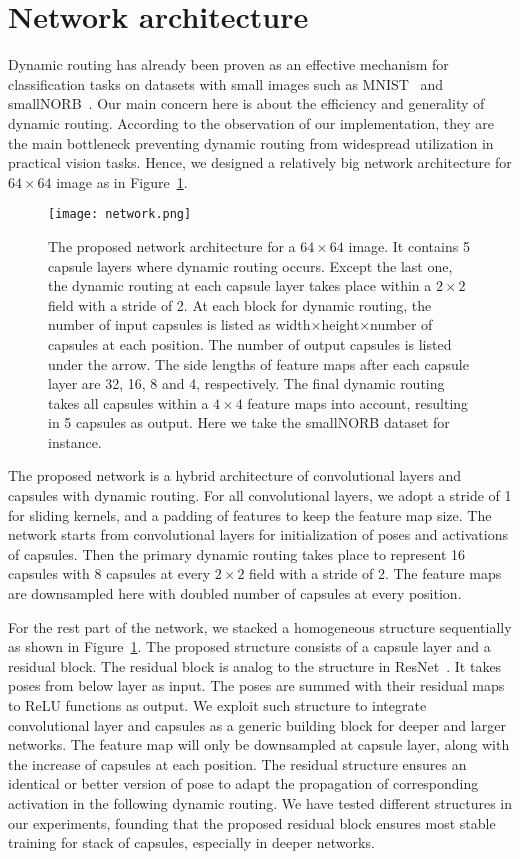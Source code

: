 \documentclass[runningheads]{llncs}
\begin{document}
\section{Network architecture}
Dynamic routing has already been proven as an effective mechanism for classification tasks on datasets with small images such as MNIST~\cite{lecun1998gradient} and smallNORB~\cite{lecun2004learning}. Our main concern here is about the efficiency and generality of dynamic routing. According to the observation of our implementation, they are the main bottleneck preventing dynamic routing from widespread utilization in practical vision tasks. Hence, we designed a relatively big network architecture for $64\times{64}$ image as in Figure~\ref{fig:network}. \begin{figure}
\centering
\texttt{[image: network.png]}
\caption{The proposed network architecture for a $64\times{64}$ image. It contains 5 capsule layers where dynamic routing occurs. Except the last one, the dynamic routing at each capsule layer takes place within a $2\times{2}$ field with a stride of 2. At each block for dynamic routing, the number of input capsules is listed as width$\times$height$\times$number of capsules at each position. The number of output capsules is listed under the arrow. The side lengths of feature maps after each capsule layer are 32, 16, 8 and 4, respectively. The final dynamic routing takes all capsules within a $4\times{4}$ feature maps into account, resulting in 5 capsules as output. Here we take the smallNORB dataset for instance.}
\label{fig:network}
\end{figure}

The proposed network is a hybrid architecture of convolutional layers and capsules with dynamic routing. For all convolutional layers, we adopt a stride of 1 for sliding kernels, and a padding of features to keep the feature map size. The network starts from convolutional layers for initialization of poses and activations of capsules. Then the primary dynamic routing takes place to represent 16 capsules with 8 capsules at every $2\times{2}$ field with a stride of 2. The feature maps are downsampled here with doubled number of capsules at every position.

For the rest part of the network, we stacked a homogeneous structure sequentially as shown in Figure~\ref{fig:network}. The proposed structure consists of a capsule layer and a residual block. The residual block is analog to the structure in ResNet~\cite{he2016deep}. It takes poses from below layer as input. The poses are summed with their residual maps to ReLU functions as output. We exploit such structure to integrate convolutional layer and capsules as a generic building block for deeper and larger networks. The feature map will only be downsampled at capsule layer, along with the increase of capsules at each position. The residual structure ensures an identical or better version of pose to adapt the propagation of corresponding activation in the following dynamic routing. We have tested different structures in our experiments, founding that the proposed residual block ensures most stable training for stack of capsules, especially in deeper networks.
\end{document}
